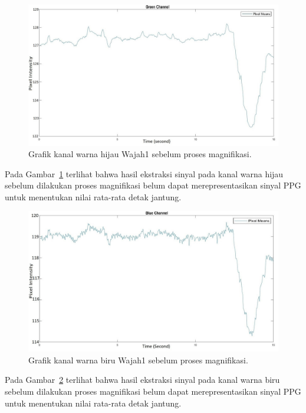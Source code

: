 \begin{figure}[ht]
	\vspace{0.5em}
	\centering
	\includegraphics[width=\textwidth,height=0.25\textheight]{Green_channel_wajah1-ori}
	\caption{Grafik kanal warna hijau Wajah1 sebelum proses magnifikasi.}
	\label{fig:grafik-green-wajah1}   
\end{figure}

Pada Gambar~\ref{fig:grafik-green-wajah1} terlihat bahwa hasil ekstraksi sinyal pada kanal warna hijau sebelum dilakukan proses magnifikasi belum dapat merepresentasikan sinyal PPG untuk menentukan nilai rata-rata detak jantung.
\newpage
\begin{figure}[ht]
	\vspace{0.5em}
	\centering
	\includegraphics[width=\textwidth,height=0.25\textheight]{Blue_channel_wajah1-ori}
	\caption{Grafik kanal warna biru Wajah1 sebelum proses magnifikasi.}
	\label{fig:grafik-blue-wajah1}   
\end{figure}

Pada Gambar~\ref{fig:grafik-blue-wajah1} terlihat bahwa hasil ekstraksi sinyal pada kanal warna biru sebelum dilakukan proses magnifikasi belum dapat merepresentasikan sinyal PPG untuk menentukan nilai rata-rata detak jantung.

